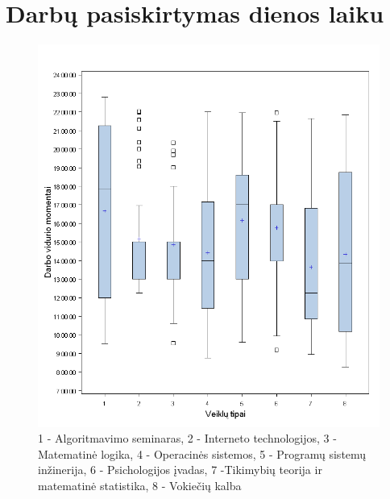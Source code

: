 \section{Darbų pasiskirtymas dienos laiku}

\begin{figure}[htb]
\includegraphics[width=0.9\linewidth]{images/midpoint_boxes.png}
\caption{1 - Algoritmavimo seminaras, 2 - Interneto technologijos, 3 -
Matematinė logika, 4 - Operacinės sistemos, 5 - Programų sistemų inžinerija,
6 - Psichologijos įvadas, 7 -Tikimybių teorija ir matematinė statistika,
8 - Vokiečių kalba}
\label{fig:boxplot}
\end{figure}